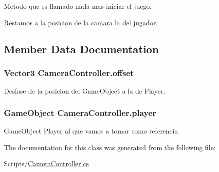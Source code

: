 Metodo que es llamado nada mas iniciar el juego. 

Restamos a la posicion de la camara la del jugador. 

\subsection{Member Data Documentation}
\hypertarget{class_camera_controller_aff80d2275dae360196361c39078bfda4}{}
\subsubsection[{offset}]{\setlength{\rightskip}{0pt plus 5cm}Vector3 Camera\+Controller.\+offset\hspace{0.3cm}{\ttfamily [private]}}\label{class_camera_controller_aff80d2275dae360196361c39078bfda4}


Desfase de la posicion del Game\+Object a la de Player. 

\hypertarget{class_camera_controller_aae794ec2d17947f671ce0eaef9aac8b7}{}
\subsubsection[{player}]{\setlength{\rightskip}{0pt plus 5cm}Game\+Object Camera\+Controller.\+player}\label{class_camera_controller_aae794ec2d17947f671ce0eaef9aac8b7}


Game\+Object Player al que vamos a tomar como referencia. 



The documentation for this class was generated from the following file\+:\begin{DoxyCompactItemize}
\item 
Scripts/\hyperlink{_camera_controller_8cs}{Camera\+Controller.\+cs}\end{DoxyCompactItemize}
